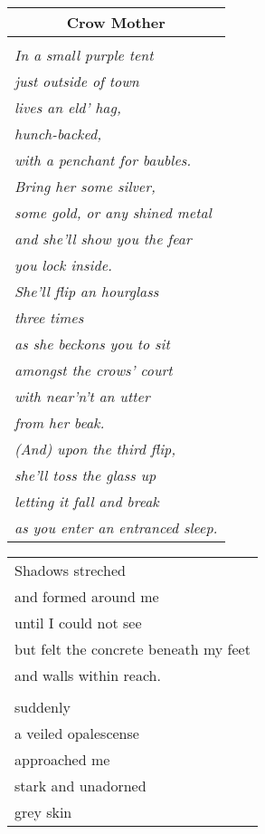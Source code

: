 \documentclass{article}
\begin{document}
\newcommand{\h}{\hspace*{2ex}}

\begin{center}
\begin{tabular}{l}
\multicolumn{1}{c}{\textbf{Crow Mother}} \\ \hline
\\
\textit{In a small purple tent} \\
\textit{just outside of town} \\
\textit{lives an eld' hag,} \\
\textit{hunch-backed,} \\
\textit{with a penchant for baubles.} \\
\textit{Bring her some silver,} \\
\textit{some gold, or any shined metal} \\
\textit{and she'll show you the fear} \\ %
\textit{you lock inside.} \\ %
\textit{She'll flip an hourglass} \\
\textit{three times} \\
\textit{as she beckons you to sit} \\
\textit{amongst the crows' court} \\
\textit{with near'n't an utter} \\
\textit{from her beak.} \\
\textit{(And) upon the third flip,} \\
\textit{she'll toss the glass up} \\
\textit{letting it fall and break} \\
\textit{as you enter an entranced sleep.} \\
\end{tabular}
\begin{tabular}{l}
Shadows streched \\
and formed around me \\
until I could not see \\
but felt the concrete beneath my feet \\
and walls within reach. \\
\\
suddenly \\
\h{}a veiled opalescense \\
\h\h{}approached me \\
stark and unadorned \\
\h{}grey skin \\

\end{tabular}
\end{center}
\end{document}
